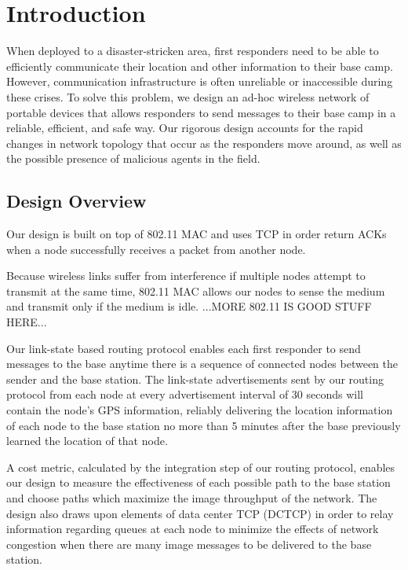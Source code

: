 \documentclass[letterpaper]{article}
\begin{document}
\section{Introduction}

When deployed to a disaster-stricken area, first responders need to be able to efficiently communicate their
location and other information to their base camp. However, communication infrastructure is often unreliable
or inaccessible during these crises. To solve this problem, we design an ad-hoc wireless network of portable
devices that allows responders to send messages to their base camp in a reliable, efficient, and safe way.
Our rigorous design accounts for the rapid changes in network topology that occur as the responders move 
around, as well as the possible presence of malicious agents in the field. 

\subsection{Design Overview}

Our design is built on top of 802.11 MAC and uses TCP in order return ACKs when a node successfully receives
a packet from another node.

Because wireless links suffer from interference if multiple nodes attempt to transmit at the same time,
802.11 MAC allows our nodes to sense the medium and transmit only if the medium is idle. ...MORE 802.11
IS GOOD STUFF HERE...

Our link-state based routing protocol enables each first responder to send messages to the base anytime there
is a sequence of connected nodes between the sender and the base station. The link-state advertisements sent
by our routing protocol from each node at every advertisement interval of 30 seconds will contain the node's
GPS  information, reliably delivering the location information of each node to the base station no more than
5 minutes after the base previously learned the location of that node.

A cost metric, calculated by the integration step of our routing protocol, enables our design to measure
the effectiveness of each possible path to the base station and choose paths which maximize the image 
throughput of the network. The design also draws upon elements of data center TCP (DCTCP) in order to relay 
information regarding queues at each node to minimize the effects of network congestion when there are many
image messages to be delivered to the base station. 
\end{document}
